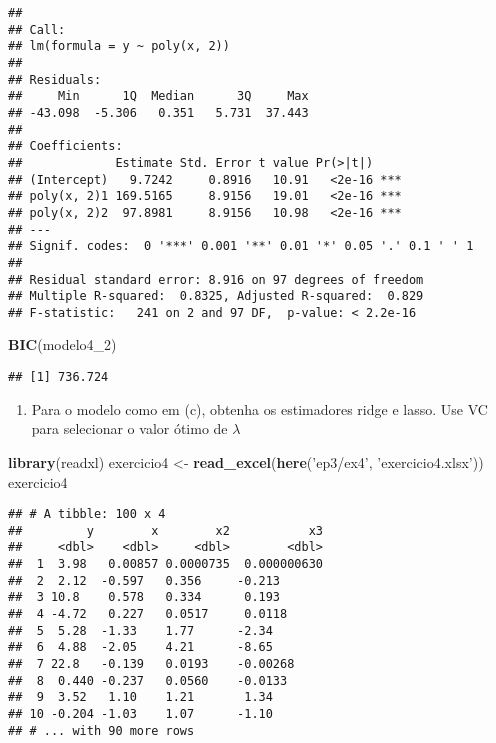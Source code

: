 \documentclass[]{article}
\newenvironment{Shaded}{\begin{snugshade}}{\end{snugshade}}
\newcommand{\DecValTok}[1]{\textcolor[rgb]{0.00,0.00,0.81}{#1}}
\newcommand{\KeywordTok}[1]{\textcolor[rgb]{0.13,0.29,0.53}{\textbf{#1}}}
\newcommand{\NormalTok}[1]{#1}
\newcommand{\StringTok}[1]{\textcolor[rgb]{0.31,0.60,0.02}{#1}}
\providecommand{\tightlist}{%
  \setlength{\itemsep}{0pt}\setlength{\parskip}{0pt}}
\begin{document}
\begin{verbatim}
## 
## Call:
## lm(formula = y ~ poly(x, 2))
## 
## Residuals:
##     Min      1Q  Median      3Q     Max 
## -43.098  -5.306   0.351   5.731  37.443 
## 
## Coefficients:
##             Estimate Std. Error t value Pr(>|t|)    
## (Intercept)   9.7242     0.8916   10.91   <2e-16 ***
## poly(x, 2)1 169.5165     8.9156   19.01   <2e-16 ***
## poly(x, 2)2  97.8981     8.9156   10.98   <2e-16 ***
## ---
## Signif. codes:  0 '***' 0.001 '**' 0.01 '*' 0.05 '.' 0.1 ' ' 1
## 
## Residual standard error: 8.916 on 97 degrees of freedom
## Multiple R-squared:  0.8325, Adjusted R-squared:  0.829 
## F-statistic:   241 on 2 and 97 DF,  p-value: < 2.2e-16
\end{verbatim}

\begin{Shaded}
\begin{Highlighting}[]
\KeywordTok{BIC}\NormalTok{(modelo4_}\DecValTok{2}\NormalTok{)}
\end{Highlighting}
\end{Shaded}

\begin{verbatim}
## [1] 736.724
\end{verbatim}

\begin{enumerate}
\def\labelenumi{(\alph{enumi})}
\setcounter{enumi}{3}
\tightlist
\item
  Para o modelo como em (c), obtenha os estimadores ridge e lasso. Use
  VC para selecionar o valor ótimo de \(\lambda\)
\end{enumerate}

\begin{Shaded}
\begin{Highlighting}[]
\KeywordTok{library}\NormalTok{(readxl)}
\NormalTok{exercicio4 <-}\StringTok{ }\KeywordTok{read_excel}\NormalTok{(}\KeywordTok{here}\NormalTok{(}\StringTok{'ep3/ex4'}\NormalTok{, }\StringTok{'exercicio4.xlsx'}\NormalTok{))}
\NormalTok{exercicio4}
\end{Highlighting}
\end{Shaded}

\begin{verbatim}
## # A tibble: 100 x 4
##         y        x        x2           x3
##     <dbl>    <dbl>     <dbl>        <dbl>
##  1  3.98   0.00857 0.0000735  0.000000630
##  2  2.12  -0.597   0.356     -0.213      
##  3 10.8    0.578   0.334      0.193      
##  4 -4.72   0.227   0.0517     0.0118     
##  5  5.28  -1.33    1.77      -2.34       
##  6  4.88  -2.05    4.21      -8.65       
##  7 22.8   -0.139   0.0193    -0.00268    
##  8  0.440 -0.237   0.0560    -0.0133     
##  9  3.52   1.10    1.21       1.34       
## 10 -0.204 -1.03    1.07      -1.10       
## # ... with 90 more rows
\end{verbatim}
\end{document}

